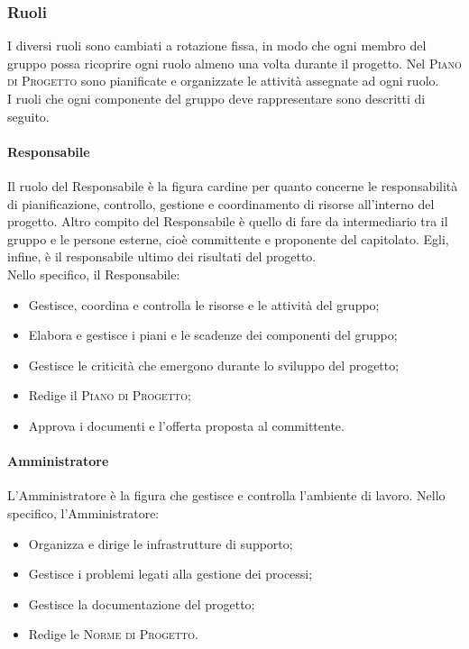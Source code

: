 \documentclass[../norme-di-progetto.tex]{subfiles}
\begin{document}
\subsubsection{Ruoli}
I diversi ruoli sono cambiati a rotazione fissa, in modo che ogni membro del gruppo possa ricoprire ogni ruolo almeno una volta durante il progetto. Nel \textsc{Piano di Progetto} sono pianificate e organizzate le attività assegnate ad ogni ruolo. \\
I ruoli che ogni componente del gruppo deve rappresentare sono descritti di seguito.
\paragraph{Responsabile}
Il ruolo del Responsabile è la figura cardine per quanto concerne le responsabilità di pianificazione, controllo, gestione e coordinamento di risorse all'interno del progetto. Altro compito del Responsabile è quello di fare da intermediario tra il gruppo e le persone esterne, cioè committente e proponente del capitolato. Egli, infine, è il responsabile ultimo dei risultati del progetto. \\
Nello specifico, il Responsabile:
\begin{itemize}
  \item Gestisce, coordina e controlla le risorse e le attività del gruppo;
  \item Elabora e gestisce i piani e le scadenze dei componenti del gruppo;
  \item Gestisce le criticità che emergono durante lo sviluppo del progetto;
  \item Redige il \textsc{Piano di Progetto};
  \item Approva i documenti e l'offerta proposta al committente.
\end{itemize}

\paragraph{Amministratore}
L'Amministratore è la figura che gestisce e controlla l'ambiente di lavoro. Nello specifico, l'Amministratore:
\begin{itemize}
  \item Organizza e dirige le infrastrutture di supporto;
  \item Gestisce i problemi legati alla gestione dei processi;
  \item Gestisce la documentazione del progetto;
  \item Redige le \textsc{Norme di Progetto}.
\end{itemize}
\end{document}
